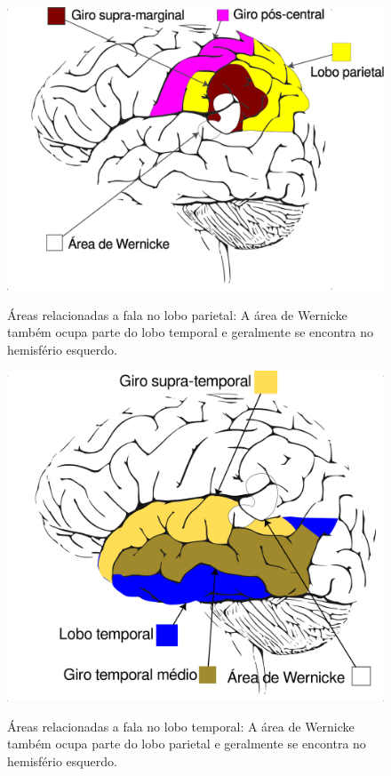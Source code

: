 			\begin{figure}[H]
				\centering
				\caption[Lobo parietal]{Áreas relacionadas a fala no lobo parietal: A área de Wernicke também ocupa parte do lobo temporal e geralmente se encontra no hemisfério esquerdo.}
				\includegraphics[width=0.72\linewidth]{images/loboparietal}
				\label{fig:loboparietal}
			\end{figure}
			
			\begin{figure}[H]
				\centering
				\caption[Lobo temporal]{Áreas relacionadas a fala no lobo temporal: A área de Wernicke também ocupa parte do lobo parietal e geralmente se encontra no hemisfério esquerdo.}
				\includegraphics[width=0.72\linewidth]{images/loboTemporal}
				\label{fig:lobotemporal}
			\end{figure}
			
